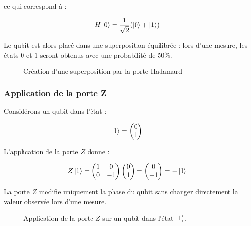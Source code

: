 \documentclass[a4paper,12pt]{article}
\begin{document}
ce qui correspond à :

\[
H\ket{0}
=
\frac{1}{\sqrt{2}}
(
\ket{0}
+
\ket{1}
)
\]

Le qubit est alors placé dans une superposition équilibrée : lors d’une mesure, les états $0$ et $1$ seront obtenus avec une probabilité de $50\%$.

\begin{figure}[H]
\centering
{}
\caption{Création d’une superposition par la porte Hadamard.}
\end{figure}

\subsubsection{Application de la porte Z}

Considérons un qubit dans l’état :

\[
\ket{1}
=
\begin{pmatrix}
0\\
1
\end{pmatrix}
\]

L’application de la porte $Z$ donne :

\[
Z\ket{1}
=
\begin{pmatrix}
1&0\\
0&-1
\end{pmatrix}
\begin{pmatrix}
0\\
1
\end{pmatrix}
=
\begin{pmatrix}
0\\
-1
\end{pmatrix}
=
-\ket{1}
\]

La porte $Z$ modifie uniquement la phase du qubit sans changer directement la valeur observée lors d’une mesure.

\begin{figure}[H]
\centering
{}
\caption{Application de la porte $Z$ sur un qubit dans l’état $\ket{1}$.}
\end{figure}
\end{document}
